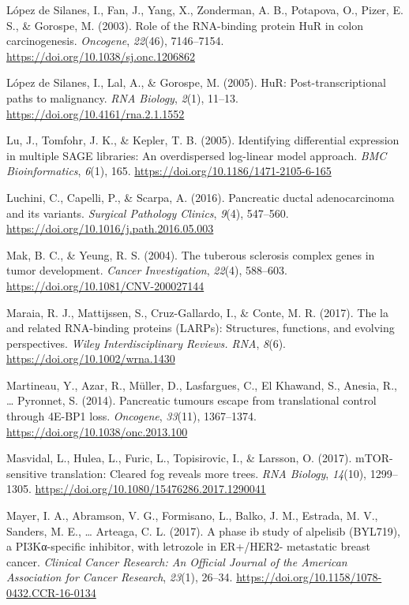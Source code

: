 \documentclass[12pt,openany]{book}
\begin{document}
\hypertarget{ref-LopezdeSilanes2003}{}
López de Silanes, I., Fan, J., Yang, X., Zonderman, A. B., Potapova, O.,
Pizer, E. S., \& Gorospe, M. (2003). Role of the RNA-binding protein HuR
in colon carcinogenesis. \emph{Oncogene}, \emph{22}(46), 7146--7154.
\url{https://doi.org/10.1038/sj.onc.1206862}

\hypertarget{ref-LopezdeSilanes2005}{}
López de Silanes, I., Lal, A., \& Gorospe, M. (2005). HuR:
Post-transcriptional paths to malignancy. \emph{RNA Biology},
\emph{2}(1), 11--13. \url{https://doi.org/10.4161/rna.2.1.1552}

\hypertarget{ref-Lu2005}{}
Lu, J., Tomfohr, J. K., \& Kepler, T. B. (2005). Identifying
differential expression in multiple SAGE libraries: An overdispersed
log-linear model approach. \emph{BMC Bioinformatics}, \emph{6}(1), 165.
\url{https://doi.org/10.1186/1471-2105-6-165}

\hypertarget{ref-Luchini2016}{}
Luchini, C., Capelli, P., \& Scarpa, A. (2016). Pancreatic ductal
adenocarcinoma and its variants. \emph{Surgical Pathology Clinics},
\emph{9}(4), 547--560. \url{https://doi.org/10.1016/j.path.2016.05.003}

\hypertarget{ref-Mak2004}{}
Mak, B. C., \& Yeung, R. S. (2004). The tuberous sclerosis complex genes
in tumor development. \emph{Cancer Investigation}, \emph{22}(4),
588--603. \url{https://doi.org/10.1081/CNV-200027144}

\hypertarget{ref-Maraia2017}{}
Maraia, R. J., Mattijssen, S., Cruz-Gallardo, I., \& Conte, M. R.
(2017). The la and related RNA-binding proteins (LARPs): Structures,
functions, and evolving perspectives. \emph{Wiley Interdisciplinary
Reviews. RNA}, \emph{8}(6). \url{https://doi.org/10.1002/wrna.1430}

\hypertarget{ref-Martineau2014}{}
Martineau, Y., Azar, R., Müller, D., Lasfargues, C., El Khawand, S.,
Anesia, R., \ldots{} Pyronnet, S. (2014). Pancreatic tumours escape from
translational control through 4E-BP1 loss. \emph{Oncogene},
\emph{33}(11), 1367--1374. \url{https://doi.org/10.1038/onc.2013.100}

\hypertarget{ref-Masvidal2017}{}
Masvidal, L., Hulea, L., Furic, L., Topisirovic, I., \& Larsson, O.
(2017). mTOR-sensitive translation: Cleared fog reveals more trees.
\emph{RNA Biology}, \emph{14}(10), 1299--1305.
\url{https://doi.org/10.1080/15476286.2017.1290041}

\hypertarget{ref-Mayer2017}{}
Mayer, I. A., Abramson, V. G., Formisano, L., Balko, J. M., Estrada, M.
V., Sanders, M. E., \ldots{} Arteaga, C. L. (2017). A phase ib study of
alpelisib (BYL719), a PI3Kα-specific inhibitor, with letrozole in
ER+/HER2- metastatic breast cancer. \emph{Clinical Cancer Research: An
Official Journal of the American Association for Cancer Research},
\emph{23}(1), 26--34.
\url{https://doi.org/10.1158/1078-0432.CCR-16-0134}
\end{document}
